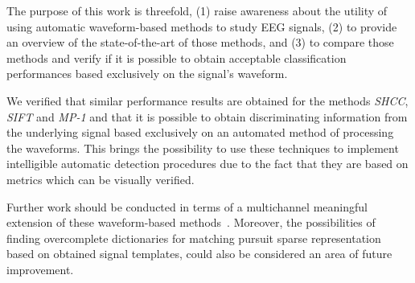 
The purpose of this work is threefold, (1) raise awareness about the utility of using automatic waveform-based methods to study EEG signals, (2) to provide an overview of the state-of-the-art of those methods, and (3) to compare those methods and verify if it is possible to obtain acceptable classification performances based exclusively on the signal's waveform.

We verified that similar performance results are obtained for the methods \textit{SHCC}, \textit{SIFT} and \textit{MP-1} and that it is possible to obtain discriminating information from the underlying signal based exclusively on an automated method of processing the waveforms.  This brings the possibility to use these techniques to implement intelligible automatic detection procedures due to the fact that they are based on metrics which can be visually verified.  

Further work should be conducted in terms of a multichannel meaningful extension of these waveform-based methods~\cite{Gribonval2008}. Moreover, the possibilities of finding overcomplete dictionaries for matching pursuit sparse representation based on obtained signal templates, could also be considered an area of future improvement.